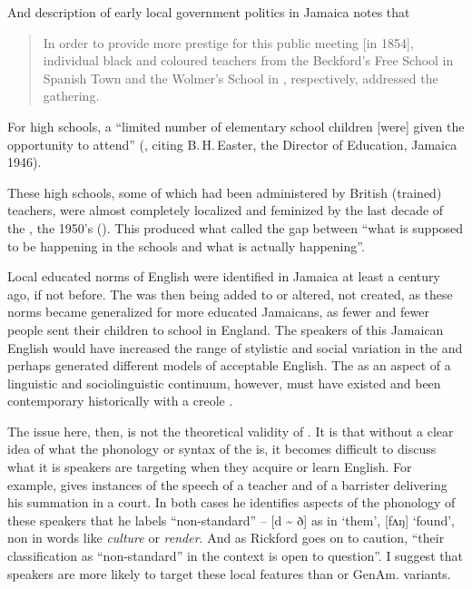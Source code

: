 And  description of early local government politics in Jamaica notes that

\begin{quote}In order to provide more prestige for this public meeting [in 1854], individual black and coloured teachers from the Beckford’s Free School in Spanish Town and the Wolmer’s School in , respectively, addressed the gathering.\end{quote}

For high schools, a “limited number of elementary school children [were] given the opportunity to attend” (\citealt[209]{Miller1989}, citing B.\,H.\,Easter, the Director of Education, Jamaica 1946).  

These high schools, some of which had been administered by British (trained) teachers, were almost completely localized and feminized by the last decade of the , the 1950's (\citealt{Miller1989}).  This produced what \citet[440]{LePage1968} called the gap between “what is supposed to be happening in the schools and what is actually happening”.

Local educated norms of English were identified in Jamaica at least a century ago, if not before.  The  was then being added to or altered, not created, as these norms became generalized for more educated Jamaicans, as fewer and fewer people sent their children to school in England.  The speakers of this Jamaican English would have increased the range of stylistic and social variation in the  and perhaps generated different models of acceptable English.  The  as an aspect of a linguistic and sociolinguistic continuum, however, must have existed and been contemporary historically with a creole .  

The issue here, then, is not the theoretical validity of .  It is that without a clear idea of what the phonology or syntax of the  is, it becomes difficult to discuss what it is speakers are targeting when they acquire or learn English.  For example, \citet[275]{Rickford1987} gives instances of the speech of a  teacher and of a barrister delivering his summation in a  court.  In both cases he identifies aspects of the phonology of these speakers that he labels “non-standard” – [d {\textasciitilde} ð] as in ‘them’, [fʌŋ] ‘found’, non  in words like \textit{culture} or \textit{render}.  And as Rickford goes on to caution, “their classification as “non-standard” in the  context is open to question”.  I suggest that  speakers are more likely to target these local features than  or GenAm. variants. 

